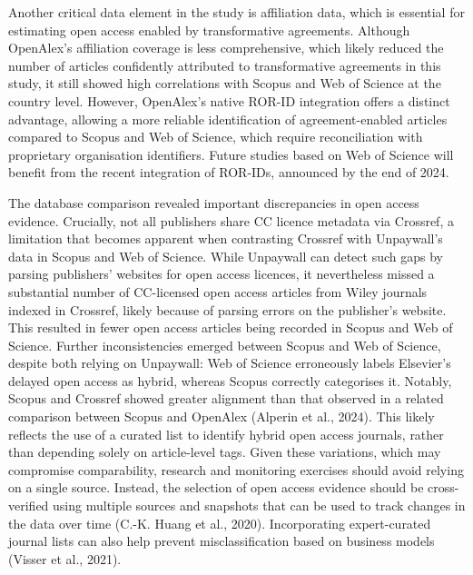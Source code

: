 \documentclass[a4paper,man,floatsintext,longtable,noextraspace,10pt]{apa6}
\begin{document}
Another critical data element in the study is affiliation data, which is
essential for estimating open access enabled by transformative
agreements. Although OpenAlex's affiliation coverage is less
comprehensive, which likely reduced the number of articles confidently
attributed to transformative agreements in this study, it still showed
high correlations with Scopus and Web of Science at the country level.
However, OpenAlex's native ROR-ID integration offers a distinct
advantage, allowing a more reliable identification of agreement-enabled
articles compared to Scopus and Web of Science, which require
reconciliation with proprietary organisation identifiers. Future studies
based on Web of Science will benefit from the recent integration of
ROR-IDs, announced by the end of 2024.

The database comparison revealed important discrepancies in open access
evidence. Crucially, not all publishers share CC licence metadata via
Crossref, a limitation that becomes apparent when contrasting Crossref
with Unpaywall's data in Scopus and Web of Science. While Unpaywall can
detect such gaps by parsing publishers' websites for open access
licences, it nevertheless missed a substantial number of CC-licensed
open access articles from Wiley journals indexed in Crossref, likely
because of parsing errors on the publisher's website. This resulted in
fewer open access articles being recorded in Scopus and Web of Science.
Further inconsistencies emerged between Scopus and Web of Science,
despite both relying on Unpaywall: Web of Science erroneously labels
Elsevier's delayed open access as hybrid, whereas Scopus correctly
categorises it. Notably, Scopus and Crossref showed greater alignment
than that observed in a related comparison between Scopus and OpenAlex
(Alperin et al., 2024). This likely reflects the use of a curated list
to identify hybrid open access journals, rather than depending solely on
article-level tags. Given these variations, which may compromise
comparability, research and monitoring exercises should avoid relying on
a single source. Instead, the selection of open access evidence should
be cross-verified using multiple sources and snapshots that can be used
to track changes in the data over time (C.-K. Huang et al., 2020).
Incorporating expert-curated journal lists can also help prevent
misclassification based on business models (Visser et al., 2021).
\end{document}

